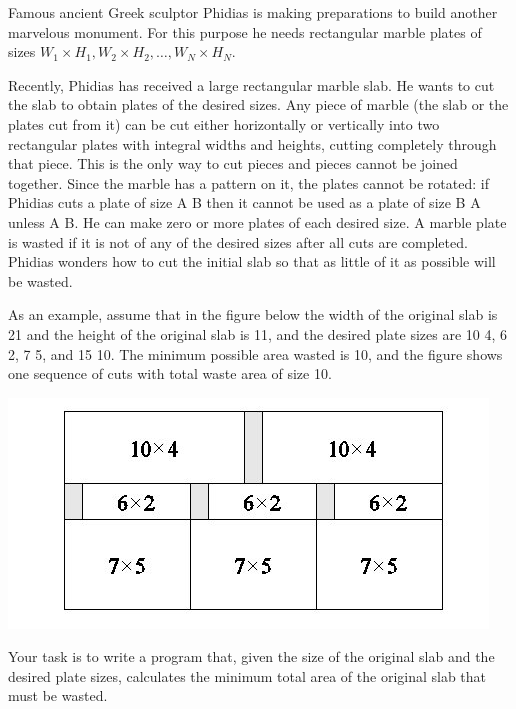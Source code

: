 Famous ancient Greek sculptor Phidias is making preparations to build another marvelous monument. For this purpose he needs rectangular marble plates of sizes $W_1\times H_1, W_2 \times H_2, \ldots, W_N \times H_N$. 

Recently, Phidias has received a large rectangular marble slab. He wants to cut the slab to obtain plates of the desired sizes. Any piece of marble (the slab or the plates cut from it) can be cut either horizontally or vertically into two rectangular plates with integral widths and heights, cutting completely through that piece. This is the only way to cut pieces and pieces cannot be joined together. Since the marble has a pattern on it, the plates cannot be rotated: if Phidias cuts a plate of size A B then it cannot be used as a plate of size B A unless A B. He can make zero or more plates of each desired size. A marble plate is wasted if it is not of any of the desired sizes after all cuts are completed. Phidias wonders how to cut the initial slab so that as little of it as possible will be wasted. 

As an example, assume that in the figure below the width of the original slab is 21 and the height of the original slab is 11, and the desired plate sizes are 10 4, 6 2, 7 5, and 15 10. The minimum possible area wasted is 10, and the figure shows one sequence of cuts with total waste area of size 10. 

\includegraphics{task2b.jpg}


Your task is to write a program that, given the size of the original slab and the desired plate sizes, calculates the minimum total area of the original slab that must be wasted.
